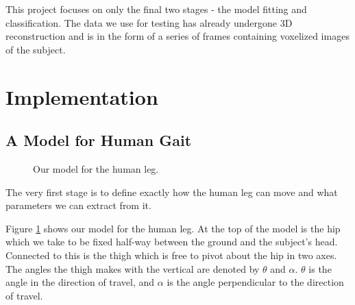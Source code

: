 \documentclass[a4paper,12pt]{article}
\begin{document}
This project focuses on only the final two stages - the model fitting and classification.
The data we use for testing has already undergone 3D reconstruction and is in the form of a series of frames containing voxelized images of the subject.


\newpage
\section{Implementation}

\subsection{A Model for Human Gait}

\begin{figure}[hb]
	\centering
	\qquad
	\caption{Our model for the human leg.}
	\label{ModelImages}
\end{figure}

The very first stage is to define exactly how the human leg can move and what parameters we can extract from it.

Figure \ref{ModelImages} shows our model for the human leg.
At the top of the model is the hip which we take to be fixed half-way between the ground and the subject's head.
Connected to this is the thigh which is free to pivot about the hip in two axes.
The angles the thigh makes with the vertical are denoted by $\theta$ and $\alpha$.
$\theta$ is the angle in the direction of travel, and $\alpha$ is the angle perpendicular to the direction of travel.
\end{document}
